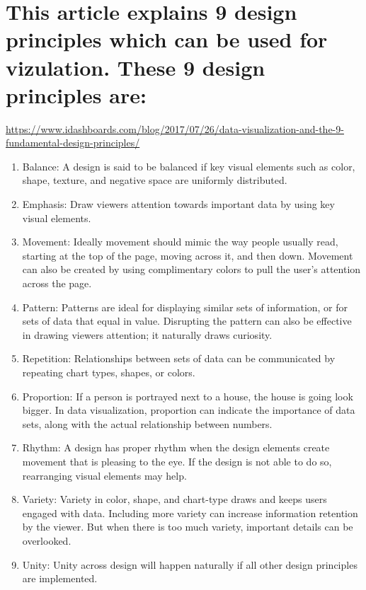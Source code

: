\documentclass[]{book}
\theoremstyle{definition}
\theoremstyle{definition}
\theoremstyle{definition}
\theoremstyle{remark}
\begin{document}
\citep{data-insights}

\section{This article explains 9 design principles which can be used for
vizulation. These 9 design principles
are:}\label{this-article-explains-9-design-principles-which-can-be-used-for-vizulation.-these-9-design-principles-are}

\url{https://www.idashboards.com/blog/2017/07/26/data-visualization-and-the-9-fundamental-design-principles/}

\begin{enumerate}
\def\labelenumi{\arabic{enumi}.}
\item
  Balance: A design is said to be balanced if key visual elements such
  as color, shape, texture, and negative space are uniformly
  distributed.
\item
  Emphasis: Draw viewers attention towards important data by using key
  visual elements.
\item
  Movement: Ideally movement should mimic the way people usually read,
  starting at the top of the page, moving across it, and then down.
  Movement can also be created by using complimentary colors to pull the
  user's attention across the page.
\item
  Pattern: Patterns are ideal for displaying similar sets of
  information, or for sets of data that equal in value. Disrupting the
  pattern can also be effective in drawing viewers attention; it
  naturally draws curiosity.
\item
  Repetition: Relationships between sets of data can be communicated by
  repeating chart types, shapes, or colors.
\item
  Proportion: If a person is portrayed next to a house, the house is
  going look bigger. In data visualization, proportion can indicate the
  importance of data sets, along with the actual relationship between
  numbers.
\item
  Rhythm: A design has proper rhythm when the design elements create
  movement that is pleasing to the eye. If the design is not able to do
  so, rearranging visual elements may help.
\item
  Variety: Variety in color, shape, and chart-type draws and keeps users
  engaged with data. Including more variety can increase information
  retention by the viewer. But when there is too much variety, important
  details can be overlooked.
\item
  Unity: Unity across design will happen naturally if all other design
  principles are implemented.
\end{enumerate}
\end{document}
